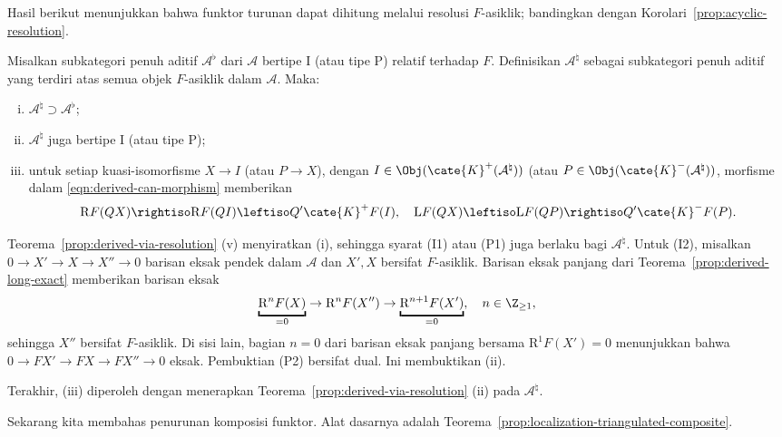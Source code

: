 Hasil berikut menunjukkan bahwa funktor turunan dapat dihitung melalui
resolusi $F$-asiklik; bandingkan dengan Korolari~\ref{prop:acyclic-resolution}.

\begin{korolari}\label{prop:derived-via-F-acyclic}
	Misalkan subkategori penuh aditif $\mathcal{A}^\flat$ dari $\mathcal{A}$
	bertipe I (atau tipe P) relatif terhadap $F$. Definisikan
	$\mathcal{A}^\natural$ sebagai subkategori penuh aditif yang terdiri atas
	semua objek $F$-asiklik dalam $\mathcal{A}$. Maka:
	\begin{enumerate}[(i)]
		\item $\mathcal{A}^\natural\supset\mathcal{A}^\flat$;
		\item $\mathcal{A}^\natural$ juga bertipe I (atau tipe P);
		\item untuk setiap kuasi-isomorfisme $X\to I$ (atau $P\to X$), dengan
		$I\in\Obj(\cate{K}^+(\mathcal{A}^\natural))$ (atau
		$P\in\Obj(\cate{K}^-(\mathcal{A}^\natural))$, morfisme dalam
		\eqref{eqn:derived-can-morphism} memberikan
		\[ \mathrm{R}F(QX) \rightiso \mathrm{R}F(QI) \leftiso Q' \cate{K}^+ F(I), \quad \mathrm{L}F(QX) \leftiso \mathrm{L}F(QP) \rightiso Q' \cate{K}^- F(P). \]
	\end{enumerate}
\end{korolari}
\begin{bukti}
	Teorema~\ref{prop:derived-via-resolution} (v) menyiratkan (i), sehingga
	syarat (I1) atau (P1) juga berlaku bagi $\mathcal{A}^\natural$. Untuk (I2),
	misalkan $0\to X'\to X\to X''\to0$ barisan eksak pendek dalam
	$\mathcal{A}$ dan $X',X$ bersifat $F$-asiklik. Barisan eksak panjang dari
	Teorema~\ref{prop:derived-long-exact} memberikan barisan eksak
	\[ \underbracket{\mathrm{R}^n F(X)}_{= 0} \to \mathrm{R}^n F(X'') \to \underbracket{\mathrm{R}^{n+1}F(X')}_{= 0}, \quad n \in \Z_{\geq 1} , \]
	sehingga $X''$ bersifat $F$-asiklik. Di sisi lain, bagian $n=0$ dari barisan
	eksak panjang bersama $\mathrm{R}^1F(X')=0$ menunjukkan bahwa
	$0\to FX'\to FX\to FX''\to0$ eksak. Pembuktian (P2) bersifat dual. Ini
	membuktikan (ii).

	Terakhir, (iii) diperoleh dengan menerapkan
	Teorema~\ref{prop:derived-via-resolution} (ii) pada $\mathcal{A}^\natural$.
\end{bukti}

Sekarang kita membahas penurunan komposisi funktor. Alat dasarnya adalah
Teorema~\ref{prop:localization-triangulated-composite}.

